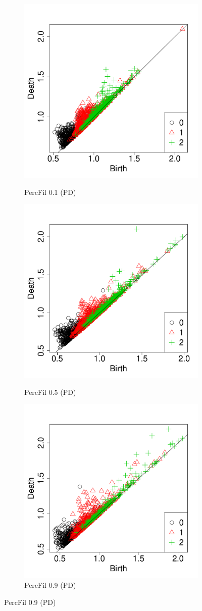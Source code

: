 \documentclass[12pt]{article}
\begin{document}
\begin{center}
\begin{figure}[htp!]
\begin{subfigure}{.32\textwidth}
      \label{fig:percfil09voronoi}
    \end{subfigure}
      \begin{subfigure}{.32\textwidth}
      \centering
      \caption{PercFil 0.1 (PD)}
      \includegraphics[width=0.6\linewidth]{figure_7_pd_0_1.pdf}
      \label{fig:percfil01pd}
    \end{subfigure}
      \begin{subfigure}{.32\textwidth}
      \centering
      \caption{PercFil 0.5 (PD)}
      \includegraphics[width=0.6\linewidth]{figure_7_pd_0_5.pdf}
      \label{fig:percfil09pd}
    \end{subfigure}
      \begin{subfigure}{.32\textwidth}
      \centering
      \caption{PercFil 0.9 (PD)}
      \includegraphics[width=0.6\linewidth]{figure_7_pd_0_9.pdf}

\end{subfigure}
\end{figure}
\end{center}
\end{document}
